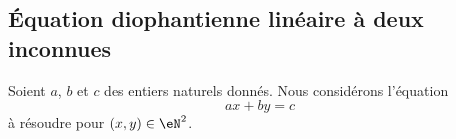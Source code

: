 \subsection{Équation diophantienne linéaire à deux inconnues}
\label{subsecZVKNooXNjPSf}


Soient \( a\), \( b\) et \( c\) des entiers naturels donnés. Nous considérons l'équation
\begin{equation}        \label{EqTOVSooJbxlIq}
	ax+by=c
\end{equation}
à résoudre\cite{PAYUooYVuNAB} pour \( (x,y)\in \eN^2\).

